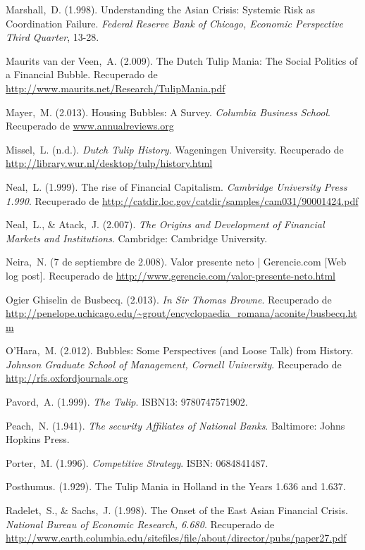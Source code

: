 \begin{thebibliography}{11}
	\bibitem{}
		Marshall, D. (1.998). Understanding the Asian Crisis: Systemic Risk as Coordination Failure. \emph{Federal Reserve Bank of Chicago, Economic Perspective Third Quarter}, 13-28. 

	\bibitem{}
		Maurits van der Veen, A. (2.009). The Dutch Tulip Mania: The Social Politics of a Financial Bubble. Recuperado de \url{http://www.maurits.net/Research/TulipMania.pdf}	

	\bibitem{}
		Mayer, M. (2.013). Housing Bubbles: A Survey. \emph{Columbia Business School}. Recuperado de \url{www.annualreviews.org}

	\bibitem{}
		Missel, L. (n.d.). \emph{Dutch Tulip History}. Wageningen University. Recuperado de \url{http://library.wur.nl/desktop/tulp/history.html}

	\bibitem{}
		Neal, L. (1.999). The rise of Financial Capitalism. \emph{Cambridge University Press 1.990}. Recuperado de \url{http://catdir.loc.gov/catdir/samples/cam031/90001424.pdf}

	\bibitem{}
		Neal, L., \& Atack, J. (2.007). \emph{The Origins and Development of Financial Markets and Institutions}. Cambridge: Cambridge University. 	 

	\bibitem{}
		Neira, N. (7 de septiembre de 2.008). Valor presente neto | Gerencie.com [Web log post]. Recuperado de \url{http://www.gerencie.com/valor-presente-neto.html}
	

	\bibitem{}
		Ogier Ghiselin de Busbecq. (2.013). \emph{In Sir Thomas Browne}. Recuperado de \url{http://penelope.uchicago.edu/~grout/encyclopaedia\_romana/aconite/busbecq.htm}

	\bibitem{}
		O’Hara, M. (2.012). Bubbles: Some Perspectives (and Loose Talk) from History. \emph{Johnson Graduate School of Management, Cornell University}. Recuperado de \url{http://rfs.oxfordjournals.org}

	\bibitem{}
		Pavord, A. (1.999). \emph{The Tulip}. ISBN13: 9780747571902. 	

	\bibitem{}
		Peach, N. (1.941). \emph{The security Affiliates of National Banks}. Baltimore: Johns Hopkins Press.

	\bibitem{}
		Porter, M. (1.996). \emph{Competitive Strategy}. ISBN: 0684841487.

	\bibitem{}
		Posthumus. (1.929). The Tulip Mania in Holland in the Years 1.636 and 1.637. 

	\bibitem{}
		Radelet, S., \& Sachs, J. (1.998). The Onset of the East Asian Financial Crisis. \emph{National Bureau of Economic Research, 6.680}. Recuperado de \url{http://www.earth.columbia.edu/sitefiles/file/about/director/pubs/paper27.pdf}


\end{thebibliography}
